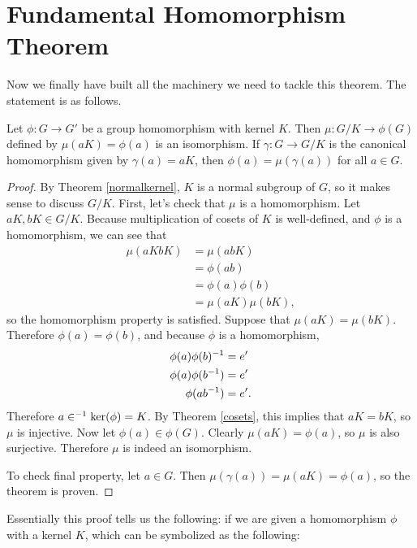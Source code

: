 \section{Fundamental Homomorphism Theorem}

Now we finally have built all the machinery we need to tackle this theorem. The statement is as follows.

\begin{theorem}
Let $\phi: G \to G'$ be a group homomorphism with kernel $K$. Then $\mu: G/K \to \phi(G)$ defined by $\mu(aK) = \phi(a)$ is an isomorphism. If $\gamma: G \to G/K$ is the canonical homomorphism given by $\gamma(a) = aK$, then $\phi(a) = \mu(\gamma(a))$ for all $a \in G$.
\end{theorem}

\begin{proof}
By Theorem \ref{normalkernel}, $K$ is a normal subgroup of $G$, so it makes sense to discuss $G/K$. First, let's check that $\mu$ is a homomorphism. Let $aK, bK \in G/K$. Because multiplication of cosets of $K$ is well-defined, and $\phi$ is a homomorphism, we can see that
\begin{align*}
    \mu(aKbK) &= \mu(abK) \\
    &= \phi(ab) \\
    &= \phi(a)\phi(b) \\
    &= \mu(aK)\mu(bK)\mathrm{,}
\end{align*}
so the homomorphism property is satisfied. Suppose that $\mu(aK) = \mu(bK).$ Therefore $\phi(a) = \phi(b)$, and because $\phi$ is a homomorphism,
\begin{align*}
    \phi(a)\phi(b)^{-1} &= e' \\
    \phi(a)\phi(b^{-1}) &= e' \\
    \phi(ab^{-1}) &= e'\mathrm{.}
\end{align*}
Therefore $a\in^{-1} \ker(\phi) = K$. By Theorem \ref{cosets}, this implies that $aK = bK$, so $\mu$ is injective. Now let $\phi(a) \in \phi(G)$. Clearly $\mu(aK) = \phi(a)$, so $\mu$ is also surjective. Therefore $\mu$ is indeed an isomorphism.

To check final property, let $a \in G$. Then $\mu(\gamma(a)) = \mu(aK) = \phi(a)$, so the theorem is proven.

\end{proof}

Essentially this proof tells us the following: if we are given a homomorphism $\phi$ with a kernel $K$, which can be symbolized as the following:

